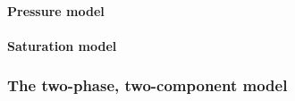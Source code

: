 \paragraph{Pressure model}


\paragraph{Saturation model}


\subsubsection{The two-phase, two-component model}


